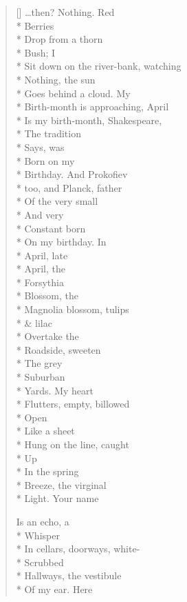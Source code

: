 \begin{verse}[\versewidth]
\ldots then? Nothing.     Red\\*
Berries\\*
Drop from a thorn\\*
Bush; I\\*
Sit down on the river-bank, watching\\*
Nothing, the sun\\*
Goes behind a cloud.  My\\*
Birth-month is approaching, April\\*
Is my birth-month, Shakespeare,\\*
The tradition\\*
Says, was\\*
Born on my\\*
Birthday.     And Prokofiev\\*
too, and Planck, father\\*
Of the very small\\*
And very\\*
Constant       born\\*
On my birthday. \qquad In\\*
April, late\\*
April, the\\*
Forsythia\\*
Blossom, the\\*
Magnolia blossom, tulips\\*
\& lilac \\*
Overtake the \\*
Roadside, sweeten\\*
The grey\\*
Suburban\\*
Yards.   My heart\\*
Flutters, empty, billowed\\*
Open\\*
Like a sheet\\*
Hung on the line, caught\\*
Up\\*
In the spring\\*
Breeze, the virginal\\*
Light.           Your name


Is an echo, a\\*
Whisper\\*
In cellars, doorways, white-\\*
Scrubbed\\*
Hallways, the vestibule\\*
Of my ear.   Here


\end{verse}
